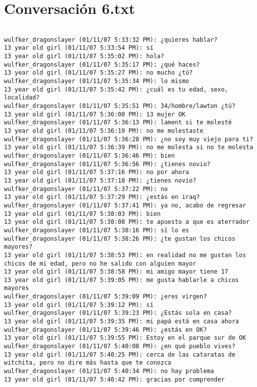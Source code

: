 \section{Conversaci\'on 6.txt}

\begin{verbatim}

wulfker_dragonslayer (01/11/07 5:33:32 PM): ¿quieres hablar?
13 year old girl (01/11/07 5:33:54 PM): sí
13 year old girl (01/11/07 5:35:02 PM): hola?
wulfker_dragonslayer (01/11/07 5:35:17 PM): ¿qué haces?
13 year old girl (01/11/07 5:35:27 PM): no mucho ¿tú?
wulfker_dragonslayer (01/11/07 5:35:34 PM): lo mismo
13 year old girl (01/11/07 5:35:42 PM): ¿cuál es tu edad, sexo, localidad?
wulfker_dragonslayer (01/11/07 5:35:51 PM): 34/hombre/lawton ¿tú?
13 year old girl (01/11/07 5:36:00 PM): 13 mujer OK
wulfker_dragonslayer (01/11/07 5:36:13 PM): lament si te molesté
13 year old girl (01/11/07 5:36:19 PM): no me molestaste
wulfker_dragonslayer (01/11/07 5:36:28 PM): ¿no soy muy viejo para ti?
13 year old girl (01/11/07 5:36:39 PM): no me molesta si no te molesta
wulfker_dragonslayer (01/11/07 5:36:46 PM): bien
wulfker_dragonslayer (01/11/07 5:36:56 PM): ¿tienes novio?
13 year old girl (01/11/07 5:37:16 PM): no por ahora
13 year old girl (01/11/07 5:37:18 PM): ¿tienes novio?
wulfker_dragonslayer (01/11/07 5:37:22 PM): no
13 year old girl (01/11/07 5:37:29 PM): ¿estás en iraq?
wulfker_dragonslayer (01/11/07 5:37:41 PM): ya no, acabo de regresar 
13 year old girl (01/11/07 5:38:03 PM): bien
13 year old girl (01/11/07 5:38:08 PM): te apuesto a que es aterrador
wulfker_dragonslayer (01/11/07 5:38:16 PM): sí lo es
wulfker_dragonslayer (01/11/07 5:38:26 PM): ¿te gustan los chicos mayores?
13 year old girl (01/11/07 5:38:53 PM): en realidad no me gustan los chicos de mi edad, pero no he salido con alguien mayor
13 year old girl (01/11/07 5:38:58 PM): mi amigo mayor tiene 17
13 year old girl (01/11/07 5:39:05 PM): me gusta hablarle a chicos mayores
wulfker_dragonslayer (01/11/07 5:39:09 PM): ¿eres virgen?
13 year old girl (01/11/07 5:39:12 PM): sí
wulfker_dragonslayer (01/11/07 5:39:23 PM): ¿Estás sola en casa?
13 year old girl (01/11/07 5:39:35 PM): mi papá está en casa ahora
wulfker_dragonslayer (01/11/07 5:39:46 PM): ¿estás en OK?
13 year old girl (01/11/07 5:39:55 PM): Estoy en el parque sur de OK
wulfker_dragonslayer (01/11/07 5:40:08 PM): ¿en qué pueblo vives?
13 year old girl (01/11/07 5:40:25 PM): cerca de las cataratas de witchita, pero no dire más hasta que te conozca
wulfker_dragonslayer (01/11/07 5:40:34 PM): no hay problema
13 year old girl (01/11/07 5:40:42 PM): gracias por comprender

\end{verbatim}
